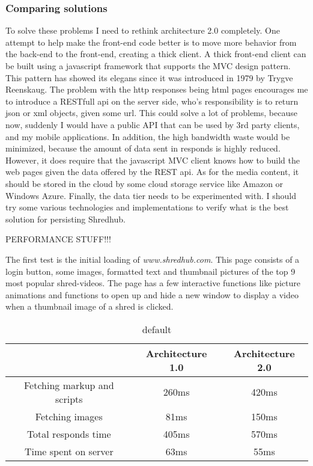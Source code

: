 	\subsubsection{Comparing solutions}
	To solve these problems I need to rethink architecture 2.0 completely. One attempt to help make the front-end code better is to move more behavior from the back-end to the front-end, creating a thick client. A thick front-end client can be built using a javascript framework that supports the MVC design pattern. This pattern has showed its elegans since it was introduced in 1979 by Trygve Reenskaug. 
	The problem with the http responses being html pages encourages me to introduce a RESTfull api on the server side, who's responsibility is to return json or xml objects, given some url. This could solve a lot of problems, because now, suddenly I would have a public API that can be used by 3rd party clients, and my mobile applications. In addition, the high bandwidth waste would be minimized, because the amount of data sent in responds is highly reduced. However, it does require that the javascript MVC client knows how to build the web pages given the data offered by the REST api.  
	As for the media content, it should be stored in the cloud by some cloud storage service like Amazon or Windows Azure. 
	Finally, the data tier needs to be experimented with. I should try some various technologies and implementations to verify what is the best solution for persisting Shredhub. 
		
		
		
		
		 PERFORMANCE STUFF!!!
		 
The first test is the initial loading of \textit{www.shredhub.com}. This page consists of a login button, some images, formatted text and thumbnail pictures of the top 9 most popular shred-videos. The page has a few interactive functions like picture animations and functions to open up and hide a new window to display a video when a thumbnail image of a shred is clicked.


\begin{table}[htdp]
\caption{default}
\begin{center}
\begin{tabular}{|c|c|c|}
\hline
& \textbf{Architecture 1.0} & \textbf{Architecture 2.0} \\ \hline
Fetching markup and scripts & 260ms & 420ms \\ \hline
Fetching images & 81ms & 150ms  \\ \hline
Total responds time & 405ms & 570ms \\ \hline
Time spent on server & 63ms & 55ms \\ \hline

\end{tabular}
\end{center}
\label{www.shredhub.com}
\end{table}%

